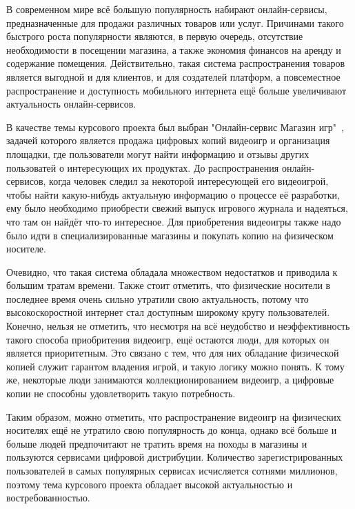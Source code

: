 \label{sec:introduction}

В современном мире всё большую популярность набирают онлайн-сервисы, предназначенные для продажи различных товаров или услуг.
Причинами такого быстрого роста популярности являются, в первую очередь, отсутствие необходимости в посещении магазина, а также
экономия финансов на аренду и содержание помещения. Действительно, такая система распространения товаров является выгодной и для клиентов,
и для создателей платформ, а повсеместное распространение и доступность мобильного интернета ещё больше увеличивают 
актуальность онлайн-сервисов.

В качестве темы курсового проекта был выбран "Онлайн-сервис Магазин игр"\ , задачей которого является продажа цифровых копий видеоигр и
организация площадки, где пользователи могут найти информацию и отзывы других пользоватей о интересующих их продуктах. До распространения
онлайн-сервисов, когда человек следил за некоторой интересующей его видеоигрой, чтобы найти какую-нибудь актуальную информацию о процессе
её разработки, ему было необходимо приобрести свежий выпуск игрового журнала и надеяться, что там он найдёт что-то интересное. Для 
приобретения видеоигры также надо было идти в специализированные магазины и покупать копию на физическом носителе.

Очевидно, что такая система обладала множеством недостатков и приводила к большим тратам времени. Также стоит отметить, что физические
носители в последнее время очень сильно утратили свою актуальность, потому что высокоскоростной интернет стал доступным широкому кругу
пользователей. Конечно, нельзя не отметить, что несмотря на всё неудобство и неэффективность такого способа приобритения видеоигр, ещё
остаются люди, для которых он является приоритетным. Это связано с тем, что для них обладание физической копией служит гарантом владения
игрой, и такую логику можно понять. К тому же, некоторые люди занимаются коллекционированием видеоигр, а цифровые копии не способны
удовлетворить такую потребность.

Таким образом, можно отметить, что распространение видеоигр на физических носителях ещё не утратило свою популярность до конца, однако
всё больше и больше людей предпочитают не тратить время на походы в магазины и пользуются сервисами цифровой дистрибуции. Количество
зарегистрированных пользователей в самых популярных сервисах исчисляется сотнями миллионов, поэтому тема курсового проекта обладает
высокой актуальностью и востребованностью.